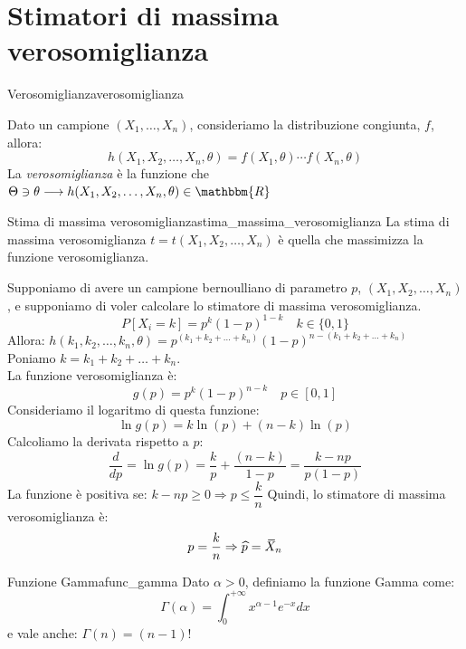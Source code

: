 \documentclass[12pt]{report}
\newcounter{definition}
\newcommand{\nmu}{}
\newcommand{\wbar}[1]{%
	\accentset{\mbox{\rule{0.55em}{0.5pt}}}{#1}%
}
\begin{document}
	\section{Stimatori di massima verosomiglianza}
	\begin{definition}{\nmu Verosomiglianza}{verosomiglianza}

		Dato un campione $(X_1, \dots, X_n)$, consideriamo la distribuzione congiunta, $f$, allora:
		\[
		h(X_1, X_2, \dots, X_n, \theta) = f(X_1, \theta) \cdots f(X_n, \theta)
		\]
		La \textit{verosomiglianza} è la funzione che $\Theta \ni \theta \longrightarrow h(X_1, X_2, \dots, X_n, \theta) \in \mathbbm{R}$
	\end{definition}
	\begin{definition}{\nmu Stima di massima verosomiglianza}{stima_massima_verosomiglianza}
		La stima di massima verosomiglianza $t=t(X_1, X_2, \dots, X_n)$ è quella che massimizza la funzione verosomiglianza.
	\end{definition}
	Supponiamo di avere un campione bernoulliano di parametro $p$, $(X_1, X_2, \dots, X_n)$, e supponiamo di voler calcolare lo stimatore di massima verosomiglianza.
	\[
	P[X_i = k] = p^k(1-p)^{1-k} \quad k \in \{0, 1\}
	\]
	Allora:
	$h(k_1, k_2, \dots, k_n, \theta) = p^{(k_1 + k_2 + \dots + k_n)}(1-p)^{n - (k_1 + k_2 + \dots + k_n)}$ \\
	Poniamo $k = k_1 + k_2 + \dots + k_n$. \\
	La funzione verosomiglianza è:
	\[
	g(p) = p^k(1-p)^{n-k} \quad p \in [0, 1]
	\]
	Consideriamo il logaritmo di questa funzione:
	\[
	\ln g(p) = k\ln(p) + (n-k)\ln(p)
	\]
	Calcoliamo la derivata rispetto a $p$:
	\[
	\dfrac{d}{dp} = \ln g(p) = \dfrac{k}{p} + \dfrac{(n-k)}{1-p} = \dfrac{k - np}{p(1-p)}
	\]
	La funzione è positiva se:
	$k - np \geq 0 \Rightarrow p \leq \dfrac{k}{n}$
	Quindi, lo stimatore di massima verosomiglianza è:
	\[
	p = \dfrac{k}{n} \Rightarrow \widehat{p} = \wbar{X}_n
	\]
	\begin{definition}{\nmu Funzione Gamma}{func_gamma}
		Dato $\alpha > 0$, definiamo la funzione Gamma come:
		\[
		\Gamma(\alpha) = \int_{0}^{+\infty}x^{\alpha - 1}e^{-x}dx
		\]
		e vale anche: $\Gamma(n) = (n - 1)!$
	\end{definition}
\end{document}
